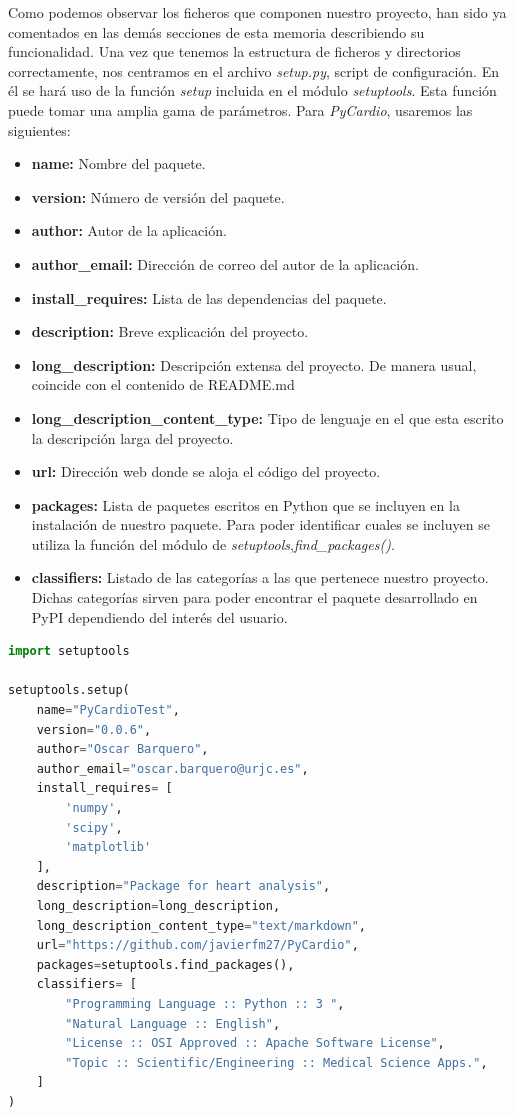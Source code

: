 Como podemos observar los ficheros que componen nuestro proyecto, han sido ya comentados en las demás secciones de esta memoria describiendo su funcionalidad. Una vez que tenemos la estructura de ficheros y directorios correctamente, nos centramos en el archivo \textit{setup.py}, script de configuración. En él se hará uso de la función \textit{setup} incluida en el módulo \textit{setuptools}. Esta función puede tomar una amplia gama de parámetros. Para \emph{PyCardio}, usaremos las siguientes:
\begin{itemize}
    \item \textbf{name: } Nombre del paquete.
    \item \textbf{version: } Número de versión del paquete.
    \item \textbf{author: } Autor de la aplicación.
    \item \textbf{author\_email: } Dirección de correo del autor de la aplicación.
    \item \textbf{install\_requires: } Lista de las dependencias del paquete.
    \item \textbf{description: } Breve explicación del proyecto.
    \item \textbf{long\_description: } Descripción extensa del proyecto. De manera usual, coincide con el contenido de README.md
    \item \textbf{long\_description\_content\_type: } Tipo de lenguaje en el que esta escrito la descripción larga del proyecto.
    \item \textbf{url: } Dirección web donde se aloja el código del proyecto.
    \item \textbf{packages: } Lista de paquetes escritos en Python que se incluyen en la instalación de nuestro paquete. Para poder identificar cuales se incluyen se utiliza la función del módulo de \textit{setuptools},\textit{find\_packages()}.
    \item \textbf{classifiers: } Listado de las categorías a las que pertenece nuestro proyecto. Dichas categorías sirven para poder encontrar el paquete desarrollado en PyPI dependiendo del interés del usuario.
\end{itemize}

\begin{lstlisting}[language=python,caption=\textit{setup.py de pyCardio}]
import setuptools

setuptools.setup(
    name="PyCardioTest",
    version="0.0.6",
    author="Oscar Barquero",
    author_email="oscar.barquero@urjc.es",
    install_requires= [
        'numpy',
        'scipy',
        'matplotlib'
    ],
    description="Package for heart analysis",
    long_description=long_description,
    long_description_content_type="text/markdown",
    url="https://github.com/javierfm27/PyCardio",
    packages=setuptools.find_packages(),
    classifiers= [
        "Programming Language :: Python :: 3 ",
        "Natural Language :: English",
        "License :: OSI Approved :: Apache Software License",
        "Topic :: Scientific/Engineering :: Medical Science Apps.",
    ]
)

\end{lstlisting}

